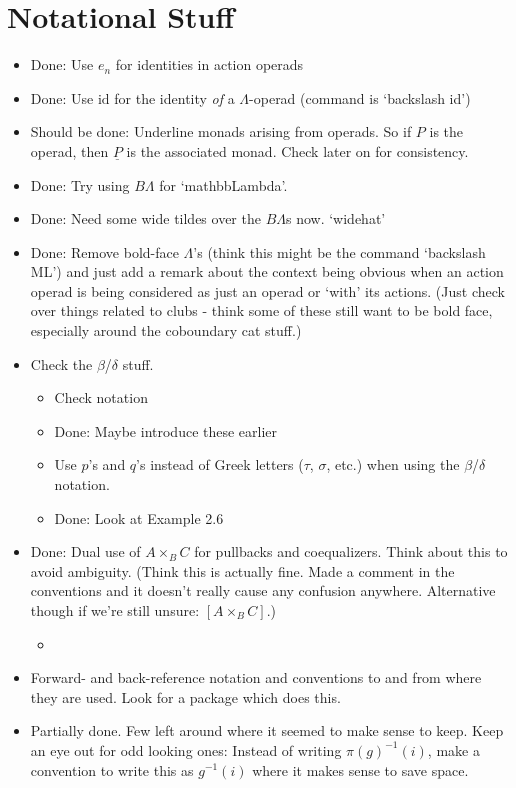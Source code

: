 \documentclass{amsart}
\begin{document}
\section*{Notational Stuff}
\begin{itemize}
	\item Done: Use $e_n$ for identities in action operads
	\item Done: Use $\mbox{id}$ for the identity \emph{of} a $\Lambda$-operad (command is `backslash id')
	\item Should be done: Underline monads arising from operads. So if $P$ is the operad, then $\underline{P}$ is the associated monad. Check later on for consistency.
	\item Done: Try using $B\Lambda$ for `mathbb{Lambda}'.
	\item Done: Need some wide tildes over the $B\Lambda$s now. `widehat'
	\item Done: Remove bold-face $\Lambda$'s (think this might be the command `backslash ML') and just add a remark about the context being obvious when an action operad is being considered as just an operad or `with' its actions. (Just check over things related to clubs - think some of these still want to be bold face, especially around the coboundary cat stuff.) 
	\item Check the $\beta$/$\delta$ stuff.
		\begin{itemize}
			\item Check notation
			\item Done: Maybe introduce these earlier
			\item Use $p$'s and $q$'s instead of Greek letters ($\tau$, $\sigma$, etc.) when using the $\beta$/$\delta$ notation.
			\item Done: Look at Example 2.6
		\end{itemize}
	\item Done: Dual use of $A \times_B C$ for pullbacks and coequalizers. Think about this to avoid ambiguity. (Think this is actually fine. Made a comment in the conventions and it doesn't really cause any confusion anywhere. Alternative though if we're still unsure: $\left[A \times_B C\right]$.)
		\begin{itemize}
			\item 
		\end{itemize}
	\item Forward- and back-reference notation and conventions to and from where they are used. Look for a package which does this.
	\item Partially done. Few left around where it seemed to make sense to keep. Keep an eye out for odd looking ones: Instead of writing $\pi(g)^{-1}(i)$, make a convention to write this as $g^{-1}(i)$ where it makes sense to save space.
\end{itemize}
\end{document}
